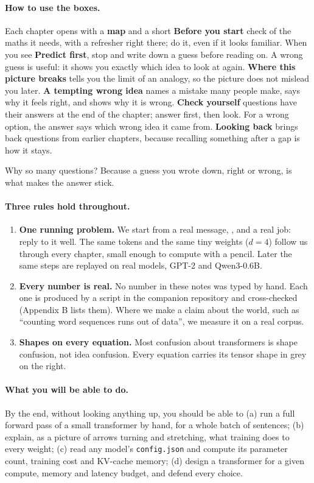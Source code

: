 \paragraph{How to use the boxes.} Each chapter opens with a \textbf{map} and a short \textbf{Before you
start} check of the maths it needs, with a refresher right there; do it, even if it looks familiar. When you
see \textbf{Predict first}, stop and write down a guess before reading on. A wrong guess is useful: it shows
you exactly which idea to look at again. \textbf{Where this picture breaks} tells you the limit of an
analogy, so the picture does not mislead you later. \textbf{A tempting wrong idea} names a mistake many
people make, says why it feels right, and shows why it is wrong. \textbf{Check yourself} questions have
their answers at the end of the chapter; answer first, then look. For a wrong option, the answer says which
wrong idea it came from. \textbf{Looking back} brings back questions from earlier chapters, because recalling
something after a gap is how it stays.

Why so many questions? Because a guess you wrote down, right or wrong, is what makes the answer stick.

\paragraph{Three rules hold throughout.}
\begin{enumerate}[label=(\roman*)]
\item \textbf{One running problem.} We start from a real message, , and a real job:
reply to it well. The same tokens and the same tiny weights ($d=4$) follow us through every chapter, small
enough to compute with a pencil. Later the same steps are replayed on real models, GPT-2 and Qwen3-0.6B.
\item \textbf{Every number is real.} No number in these notes was typed by hand. Each one is produced by a
script in the companion repository and cross-checked (Appendix B lists them). Where we make a claim about the
world, such as ``counting word sequences runs out of data'', we measure it on a real corpus.
\item \textbf{Shapes on every equation.} Most confusion about transformers is shape confusion, not idea
confusion. Every equation carries its tensor shape in grey on the right.
\end{enumerate}

\paragraph{What you will be able to do.} By the end, without looking anything up, you should be able to
(a) run a full forward pass of a small transformer by hand, for a whole batch of sentences;
(b) explain, as a picture of arrows turning and stretching, what training does to every weight;
(c) read any model's \texttt{config.json} and compute its parameter count, training cost and KV-cache memory;
(d) design a transformer for a given compute, memory and latency budget, and defend every choice.

